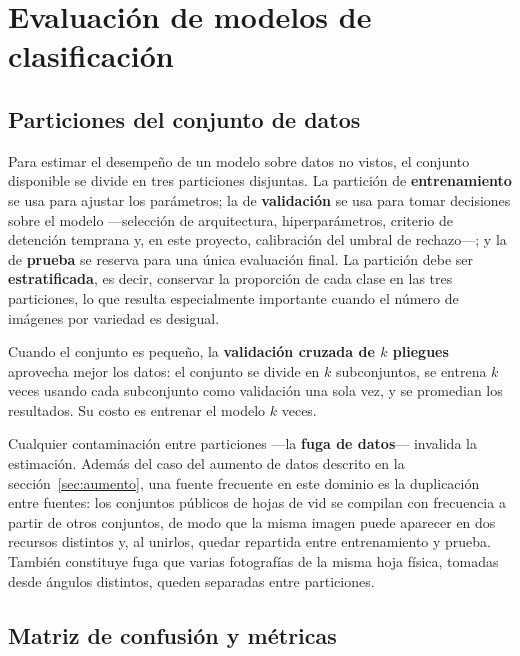 \section{Evaluación de modelos de clasificación}

\subsection{Particiones del conjunto de datos}

Para estimar el desempeño de un modelo sobre datos no vistos, el conjunto
disponible se divide en tres particiones disjuntas. La partición de
\textbf{entrenamiento} se usa para ajustar los parámetros; la de
\textbf{validación} se usa para tomar decisiones sobre el modelo —selección
de arquitectura, hiperparámetros, criterio de detención temprana y, en este
proyecto, calibración del umbral de rechazo—; y la de \textbf{prueba} se
reserva para una única evaluación final. La partición debe ser
\textbf{estratificada}, es decir, conservar la proporción de cada clase en
las tres particiones, lo que resulta especialmente importante cuando el
número de imágenes por variedad es desigual.

Cuando el conjunto es pequeño, la \textbf{validación cruzada de $k$
pliegues} aprovecha mejor los datos: el conjunto se divide en $k$
subconjuntos, se entrena $k$ veces usando cada subconjunto como validación
una sola vez, y se promedian los resultados. Su costo es entrenar el modelo
$k$ veces.

Cualquier contaminación entre particiones —la \textbf{fuga de datos}—
invalida la estimación. Además del caso del aumento de datos descrito en la
sección~\ref{sec:aumento}, una fuente frecuente en este dominio es la
duplicación entre fuentes: los conjuntos públicos de hojas de vid se
compilan con frecuencia a partir de otros conjuntos, de modo que la misma
imagen puede aparecer en dos recursos distintos y, al unirlos, quedar
repartida entre entrenamiento y prueba. También constituye fuga que varias
fotografías de la misma hoja física, tomadas desde ángulos distintos,
queden separadas entre particiones.

\subsection{Matriz de confusión y métricas}

